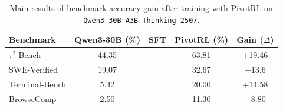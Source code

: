 \begin{table}[!t]
\centering
\small
\begin{tabular}{lcccc}
\toprule
\textbf{Benchmark} & \textbf{Qwen3-30B (\%)} & SFT & \textbf{PivotRL (\%)} & \textbf{Gain ($\Delta$)} \\ 
\midrule
$\tau^2$-Bench     & 44.35 & & 63.81 & +19.46 \\
SWE-Verified       & 19.07 & & 32.67 & +13.6 \\
Terminal-Bench     & 5.42  & & 20.00 & +14.58 \\ 
BrowseComp         & 2.50  & & 11.30 & +8.80  \\
\bottomrule
\end{tabular}
\caption{Main results of benchmark accuracy gain after training with PivotRL on \texttt{Qwen3-30B-A3B-Thinking-2507}.}
\label{tab:main_results_enhanced}
\end{table}


